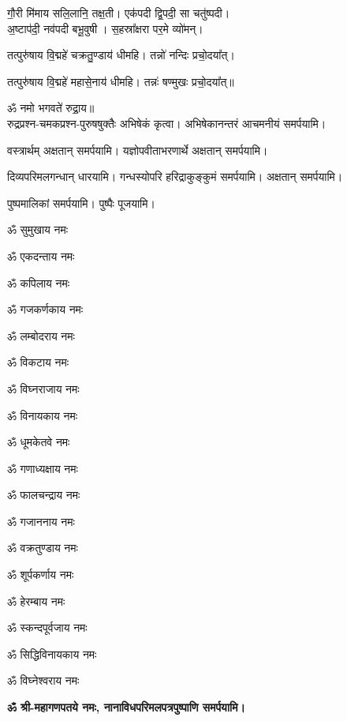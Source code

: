 \begin{center}
गौ॒री मि॑माय सलि॒लानि॒ तक्ष॒ती। एक॑पदी द्वि॒पदी॒ सा चतु॑ष्पदी।\\
अ॒ष्टाप॑दी॒ नव॑पदी बभू॒वुषी। स॒हस्रा᳚क्षरा पर॒मे व्यो॑मन्।

तत्पुरु॑षाय वि॒द्महे॑ चक्रतु॒ण्डाय॑ धीमहि। तन्नो॑ नन्दिः प्रचो॒दया᳚त्।

तत्पुरु॑षाय वि॒द्महे॑ महासे॒नाय॑ धीमहि। तन्नः॑ षण्मुखः प्रचो॒दया᳚त्॥

ॐ नमो भगवते॑ रुद्रा॒य॥\\
रुद्रप्रश्न-चमकप्रश्न-पुरुषषुक्तैः अभिषेकं कृत्वा। अभिषेकानन्तरं आचमनीयं समर्पयामि। 

वस्त्रार्थम् अक्षतान् समर्पयामि। यज्ञोपवीताभरणार्थे अक्षतान् समर्पयामि।

दिव्यपरिमलगन्धान् धारयामि। गन्धस्योपरि हरिद्राकुङ्कुमं समर्पयामि। अक्षतान् समर्पयामि।

पुष्पमालिकां समर्पयामि। पुष्पैः पूजयामि।

\clearpage
{}

\begin{enumerate}%
\begin{minipage}{0.475\linewidth}
\item ॐ सुमुखाय नमः
\item ॐ एकदन्ताय नमः
\item ॐ कपिलाय नमः
\item ॐ गजकर्णकाय नमः
\item ॐ लम्बोदराय नमः
\item ॐ विकटाय नमः
\item ॐ विघ्नराजाय नमः
\item ॐ विनायकाय नमः
\item ॐ धूमकेतवे नमः
\end{minipage}
\begin{minipage}{0.525\linewidth}
\item ॐ गणाध्यक्षाय नमः
\item ॐ फालचन्द्राय नमः
\item ॐ गजाननाय नमः
\item ॐ वक्रतुण्डाय नमः
\item ॐ शूर्पकर्णाय नमः
\item ॐ हेरम्बाय नमः
\item ॐ स्कन्दपूर्वजाय नमः
\item ॐ सिद्धिविनायकाय नमः
\item ॐ विघ्नेश्वराय नमः
\end{minipage}
\end{enumerate}

\textbf{ॐ श्री-महागणपतये नमः, नानाविधपरिमलपत्रपुष्पाणि समर्पयामि।} \medskip


\end{center}
